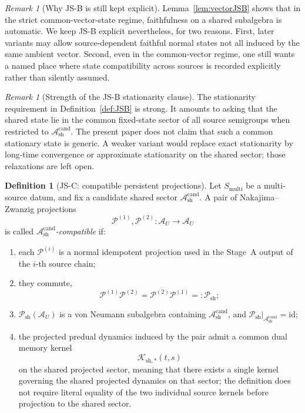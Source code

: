 \documentclass[12pt]{article}
\theoremstyle{definition}
\newtheorem{definition}[theorem]{Definition}
\theoremstyle{remark}
\newtheorem{remark}[theorem]{Remark}
\begin{document}
\begin{remark}[Why JS-B is still kept explicit]
Lemma~\ref{lem:vectorJSB} shows that in the strict common-vector-state
regime, faithfulness on a shared subalgebra is automatic. We keep JS-B
explicit nevertheless, for two reasons. First, later variants may allow
source-dependent faithful normal states not all induced by the same
ambient vector. Second, even in the common-vector regime, one still
wants a named place where state compatibility across sources is recorded
explicitly rather than silently assumed.
\end{remark}

\begin{remark}[Strength of the JS-B stationarity clause]
The stationarity requirement in Definition~\ref{def:JSB} is strong. It
amounts to asking that the shared state lie in the common fixed-state
sector of all source semigroups when restricted to
\(\mathcal A_{\mathrm{sh}}^{\mathrm{cand}}\). The present paper does not
claim that such a common stationary state is generic. A weaker variant
would replace exact stationarity by long-time convergence or approximate
stationarity on the shared sector; those relaxations are left open.
\end{remark}

\begin{definition}[JS-C: compatible persistent projections]\label{def:JSC}
Let \(S_{\mathrm{multi}}\) be a multi-source datum, and fix a candidate
shared sector \(\mathcal A_{\mathrm{sh}}^{\mathrm{cand}}\). A pair of
Nakajima--Zwanzig projections
\[
\mathcal P^{(1)},\mathcal P^{(2)}:\mathcal A_U\to\mathcal A_U
\]
is called \emph{\(\mathcal A_{\mathrm{sh}}^{\mathrm{cand}}\)-compatible}
if:
\begin{enumerate}
\item each \(\mathcal P^{(i)}\) is a normal idempotent projection used
  in the Stage~A output of the \(i\)-th source chain;
\item they commute,
  \[
  \mathcal P^{(1)}\mathcal P^{(2)}
  =
  \mathcal P^{(2)}\mathcal P^{(1)}
  =:\mathcal P_{\mathrm{sh}};
  \]
\item \(\mathcal P_{\mathrm{sh}}(\mathcal A_U)\) is a von Neumann
  subalgebra containing
  \(\mathcal A_{\mathrm{sh}}^{\mathrm{cand}}\), and
  \(\mathcal P_{\mathrm{sh}}|_{\mathcal A_{\mathrm{sh}}^{\mathrm{cand}}}
  = \mathrm{id}\);
\item the projected predual dynamics induced by the pair admit a common
  dual memory kernel
  \[
  \mathcal K_{\mathrm{sh},*}(t,s)
  \]
  on the shared projected sector, meaning that there exists a single
  kernel governing the shared projected dynamics on that sector; the
  definition does not require literal equality of the two individual
  source kernels before projection to the shared sector.
\end{enumerate}
\end{definition}
\end{document}
